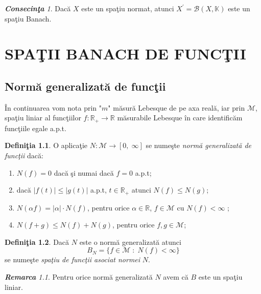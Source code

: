 \documentclass[ a4paper, 12pt]{report}
\theoremstyle{definition}
\newtheorem{definition}{\bf Defini\c tia}[section]
\theoremstyle{remark}
\newtheorem{remarc}{\bf Remarca}[section]
\newtheorem{cons}{\bf Consecin\c ta }[section]
\numberwithin{equation}{section}
\begin{document}
\begin{cons}
Dac\u a $X$ este un spa\c tiu normat, atunci $X^{'} = \mathcal{B}(X,\mathbb{K})$ este un spa\c tiu Banach.
\end{cons}








\newpage
\chapter{SPA\c TII BANACH DE FUNC\c TII}
\vspace{5mm}

\section{Norm\u a generalizat\u a de func\c tii}

 \^ In continuarea vom nota prin "$m$" m\u asur\u a Lebesque de pe axa real\u a, iar prin  $\mathcal{M}$, spa\c tiu liniar al func\c tiilor $f:\mathbb{R}_+\rightarrow \mathbb{R}$ m\u asurabile Lebesque \^in care identific\u am func\c tiile egale a.p.t.

\begin{definition}\label{defnormeigen}
O aplica\c tie $N:\mathcal{M}\rightarrow[0,\; \infty]$ se nume\c ste \emph{norm\u a generalizat\u a de func\c tii} dac\u a:
\begin{enumerate}
\item $N(f)=0$ dac\u a \c si numai dac\u a $f=0$ a.p.t;
\item dac\u a $ \lvert f(t) \rvert\leqslant \lvert g(t) \rvert$ a.p.t, $t\in \mathbb{R}_+$ atunci $N(f)\leqslant N(g)$;
\item $N(\alpha f)=\lvert \alpha \rvert \cdot N(f)$, pentru orice $\alpha\in \mathbb{R}$, $f\in \mathcal{M}$ cu $N(f)<\infty$ ;
\item $N(f+g)\leqslant N(f)+N(g) $, pentru orice $f,g\in \mathcal{M}$;
\end{enumerate}
\end{definition}

\begin{definition}
Dac\u a $N$ este o norm\u a generalizat\u a atunci
$$B_N=\{f \in \mathcal{M}\; : \; N(f)<\infty\}$$ se nume\c ste \emph{spa\c tiu de func\c tii asociat normei} $N$.
\end{definition}

\begin{remarc} Pentru orice norm\u a generalizat\u a $N$ avem c\u a
$B$  este un spa\c tiu liniar.
\end{remarc}
\end{document}
